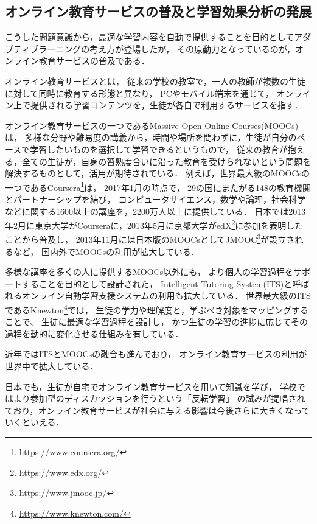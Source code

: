 \subsection{オンライン教育サービスの普及と学習効果分析の発展}
こうした問題意識から，最適な学習内容を自動で提供することを目的としてアダプティブラーニングの考え方が登場したが，
その原動力となっているのが，オンライン教育サービスの普及である．

オンライン教育サービスとは，
従来の学校の教室で，一人の教師が複数の生徒に対して同時に教育する形態と異なり，
PCやモバイル端末を通じて，
オンライン上で提供される学習コンテンツを，生徒が各自で利用するサービスを指す．

オンライン教育サービスの一つであるMassive Open Online Courses(MOOCs)\cite{mcauley2010mooc, pappano2012year,siemens2013massive}は，
多様な分野や難易度の講義から，時間や場所を問わずに，生徒が自分のペースで学習したいものを選択して学習できるというもので，
従来の教育が抱える，全ての生徒が，自身の習熟度合いに沿った教育を受けられないという問題を解決するものとして，活用が期待されている．
例えば，世界最大級のMOOCsの一つであるCoursera\footnote{\url{https://www.coursera.org/}}は，
2017年1月の時点で，
29の国にまたがる148の教育機関とパートナーシップを結び，
コンピュータサイエンス，数学や論理，社会科学などに関する1600以上の講座を，2200万人以上に提供している．
日本では2013年2月に東京大学がCourseraに，2013年5月に京都大学がedX\footnote{\url{https://www.edx.org/}}に参加を表明したことから普及し，
2013年11月には日本版のMOOCsとしてJMOOC\footnote{\url{https://www.jmooc.jp/}}が設立されるなど，
国内外でMOOCsの利用が拡大している．

多様な講座を多くの人に提供するMOOCs以外にも，
より個人の学習過程をサポートすることを目的として設計された，
Intelligent Tutoring System(ITS)と呼ばれるオンライン自動学習支援システムの利用も拡大している．
世界最大級のITSであるKnewton\footnote{\url{https://www.knewton.com/}}では，
生徒の学力や理解度と，学ぶべき対象をマッピングすることで、
生徒に最適な学習過程を設計し，
かつ生徒の学習の進捗に応じてその過程を動的に変化させる仕組みを有している\cite{upbin2012knewton}．

近年ではITSとMOOCsの融合も進んでおり\cite{aleven2015beginning}，
オンライン教育サービスの利用が世界中で拡大している．

日本でも，生徒が自宅でオンライン教育サービスを用いて知識を学び，
学校ではより参加型のディスカッションを行うという「反転学習」
の試みが提唱されており，オンライン教育サービスが社会に与える影響は今後さらに大きくなっていくといえる\cite{lage2000inverting, 重田勝介2014反転授業}．


